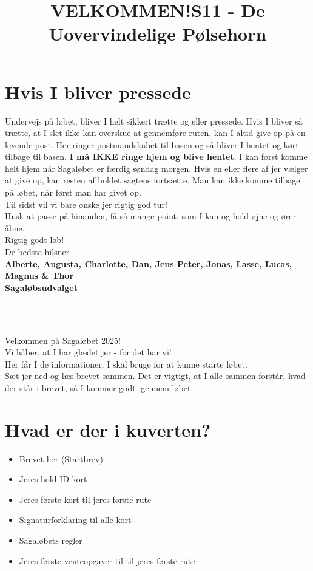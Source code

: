 \section{Hvis I bliver pressede}
Undervejs på løbet, bliver I helt sikkert trætte og eller pressede. Hvis I bliver så trætte, at I slet ikke kan overskue at gennemføre ruten, kan I altid give op på en levende post. Her ringer postmandskabet til basen og så bliver I hentet og kørt tilbage til basen. \textbf{I må IKKE ringe hjem og blive hentet}. I kan først komme helt hjem når Sagaløbet er færdig søndag morgen. Hvis en eller flere af jer vælger at give op, kan resten af holdet sagtens fortsætte. Man kan ikke komme tilbage på løbet, når først man har givet op.\\
\newline
Til sidst vil vi bare ønske jer rigtig god tur!\\
Husk at passe på hinanden, få så mange point, som I kan og hold øjne og ører åbne.\\
\newline
Rigtig godt løb!\\
\newline
\textcolor{søblå}{De bedste hilsner}\\
\textcolor{natblå}{\textbf{Alberte, Augusta, Charlotte, Dan, Jens Peter, Jonas, Lasse, Lucas, Magnus \& Thor}}\\
\textcolor{natblå}{\textbf{Sagaløbsudvalget}}\\
\newpage
\title{VELKOMMEN!}\\
\newline
\title{\textcolor{flammefarvet}{S11 - De Uovervindelige Pølsehorn }}\\
\newline
Velkommen på Sagaløbet 2025!\\
Vi håber, at I har glædet jer - for det har vi!\\
Her får I de informationer, I skal bruge for at kunne starte løbet.\\
Sæt jer ned og læs brevet sammen. Det er vigtigt, at I alle sammen forstår, hvad der står i brevet, så I kommer godt igennem løbet.
\section{Hvad er der i kuverten?}
\begin{itemize}
    \item Brevet her (Startbrev)
    \item Jeres hold ID-kort
    \item Jeres første kort til jeres første rute
    \item Signaturforklaring til alle kort
    \item Sagaløbets regler
    \item Jeres første venteopgaver til til jeres første rute
\end{itemize}
